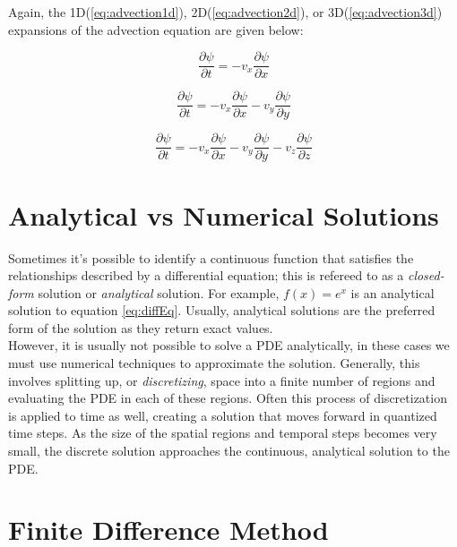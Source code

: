 {    Again, the 1D(\ref{eq:advection1d}), 2D(\ref{eq:advection2d}), or 3D(\ref{eq:advection3d}) expansions of the advection equation are given below:
 
 \begin{equation}\label{eq:advection1d}
  \frac{\partial \psi}{\partial t} = -v_{x}\frac{\partial \psi}{\partial x}
  \end{equation}
  
   \begin{equation}\label{eq:advection2d}
  \frac{\partial \psi}{\partial t} = -v_{x}\frac{\partial \psi}{\partial x}-v_{y}\frac{\partial \psi}{\partial y}
  \end{equation}
  
   \begin{equation}\label{eq:advection3d}
  \frac{\partial \psi}{\partial t} = -v_{x}\frac{\partial \psi}{\partial x}-v_{y}\frac{\partial \psi}{\partial y}-v_{z}\frac{\partial \psi}{\partial z}
  \end{equation}
  
\section{Analytical vs Numerical Solutions}

Sometimes it's possible to identify a continuous function that satisfies the relationships described by a differential equation; this is refereed to as a \textit{closed-form} solution or \textit{analytical} solution.  For example, $f(x)=e^{x}$ is an analytical solution to equation \ref{eq:diffEq}.  Usually, analytical solutions are the preferred form of the solution as they return exact values.\\

However, it is usually not possible to solve a PDE analytically, in these cases we must use numerical techniques to approximate the solution.  Generally, this involves splitting up, or \textit{discretizing}, space into a finite number of regions and evaluating the PDE in each of these regions.  Often this process of discretization is applied to time as well, creating a solution that moves forward in quantized time steps.  As the size of the spatial regions and temporal steps becomes very small, the discrete solution approaches the continuous, analytical solution to the PDE.

\section{Finite Difference Method}

}
